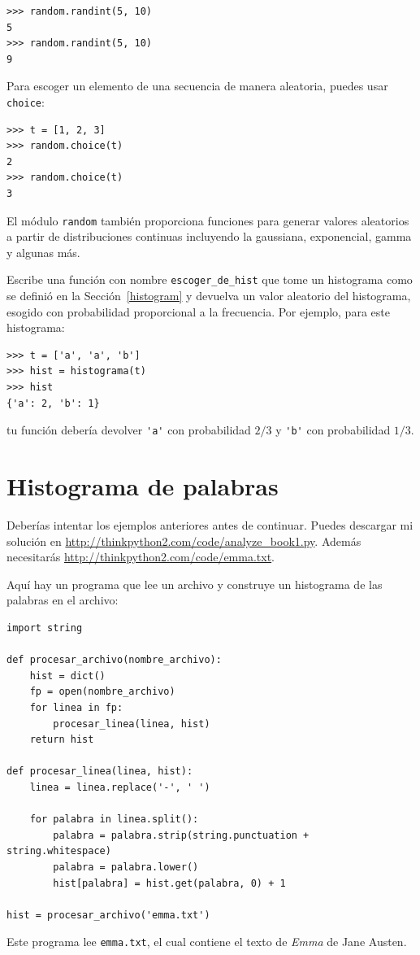 \documentclass[10pt]{book}
\begin{document}
\begin{verbatim}
>>> random.randint(5, 10)
5
>>> random.randint(5, 10)
9
\end{verbatim}
%
Para escoger un elemento de una secuencia de manera aleatoria, puedes usar
{\tt choice}:

\begin{verbatim}
>>> t = [1, 2, 3]
>>> random.choice(t)
2
>>> random.choice(t)
3
\end{verbatim}
%
El módulo {\tt random} también proporciona funciones para generar
valores aleatorios a partir de distribuciones continuas incluyendo
la gaussiana, exponencial, gamma y algunas más.

\begin{exercise}

Escribe una función con nombre \verb"escoger_de_hist" que tome
un histograma como se definió en la Sección~\ref{histogram} y devuelva un
valor aleatorio del histograma, esogido con probabilidad
proporcional a la frecuencia.  Por ejemplo, para este histograma:

\begin{verbatim}
>>> t = ['a', 'a', 'b']
>>> hist = histograma(t)
>>> hist
{'a': 2, 'b': 1}
\end{verbatim}
%
tu función debería devolver \verb"'a'" con probabilidad $2/3$ y \verb"'b'"
con probabilidad $1/3$.
\end{exercise}


\section{Histograma de palabras}

Deberías intentar los ejemplos anteriores antes de continuar.
Puedes descargar mi solución en
 \url{http://thinkpython2.com/code/analyze_book1.py}.  Además
necesitarás \url{http://thinkpython2.com/code/emma.txt}.

Aquí hay un programa que lee un archivo y construye un histograma de las
palabras en el archivo:

\begin{verbatim}
import string

def procesar_archivo(nombre_archivo):
    hist = dict()
    fp = open(nombre_archivo)
    for linea in fp:
        procesar_linea(linea, hist)
    return hist

def procesar_linea(linea, hist):
    linea = linea.replace('-', ' ')

    for palabra in linea.split():
        palabra = palabra.strip(string.punctuation + string.whitespace)
        palabra = palabra.lower()
        hist[palabra] = hist.get(palabra, 0) + 1

hist = procesar_archivo('emma.txt')
\end{verbatim}
%
Este programa lee {\tt emma.txt}, el cual contiene el texto de {\em
  Emma} de Jane Austen.
\end{document}
